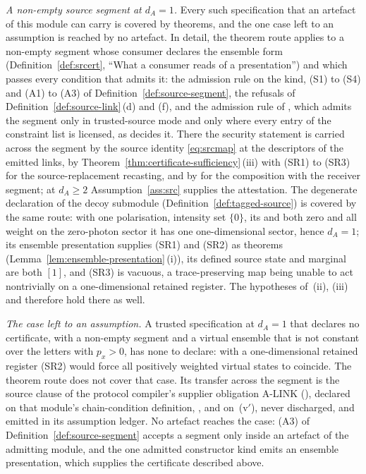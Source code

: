 \begin{remark}
\emph{A non-empty source segment at $d_A=1$.} Every such specification that
an artefact of this module can carry is covered by theorems, and the one case
left to an assumption is reached by no artefact. In detail, the theorem route
applies to a non-empty segment whose consumer declares the ensemble form
(Definition~\ref{def:srcert}, ``What a consumer reads of a presentation'')
and which passes every condition that admits it: the admission rule on the
kind, (S1) to (S4) and (A1) to (A3) of Definition~\ref{def:source-segment},
the refusals of Definition~\ref{def:source-link}\,(d) and (f), and the
admission rule of , which admits the segment only
in trusted-source mode and only where every entry of the constraint list is
licensed, as  decides it. There the
security statement is carried across the segment by the source identity
\eqref{eq:srcmap} at the descriptors of the emitted links, by
Theorem~\ref{thm:certificate-sufficiency}\,(iii) with (SR1) to (SR3) for the source-replacement
recasting, and by  for the composition with
the receiver segment; at $d_A\ge2$ Assumption~\ref{ass:src} supplies the
attestation. The degenerate declaration of the decoy submodule
(Definition~\ref{def:tagged-source}) is covered by the same route: with one
polarisation, intensity set $\{0\}$, its  and
 both zero and
all weight on the zero-photon sector it has one one-dimensional sector, hence
$d_A=1$; its ensemble presentation supplies (SR1) and (SR2) as theorems
(Lemma~\ref{lem:ensemble-presentation}\,(i)), its defined source state and
marginal are both $[1]$, and (SR3) is vacuous, a trace-preserving map being
unable to act nontrivially on a one-dimensional retained register. The
hypotheses of \,(ii), (iii) and
 therefore hold there as well.

\emph{The case left to an assumption.} A trusted specification at $d_A=1$
that declares no certificate, with a non-empty segment and a virtual
ensemble that is not constant over the letters with $p_x>0$, has none to
declare: with a one-dimensional retained register (SR2) would force all
positively weighted virtual states to coincide. The theorem route does not
cover that case. Its transfer across the segment is the source clause of the
protocol compiler's supplier obligation A-LINK
(), declared on that module's
chain-condition definition, , and on
\,(v$'$), never discharged, and emitted in
its assumption ledger. No artefact reaches the case: (A3) of
Definition~\ref{def:source-segment} accepts a segment only inside an artefact
of the admitting module, and the one admitted constructor kind emits an
ensemble presentation, which supplies the certificate described above.
\end{remark}
